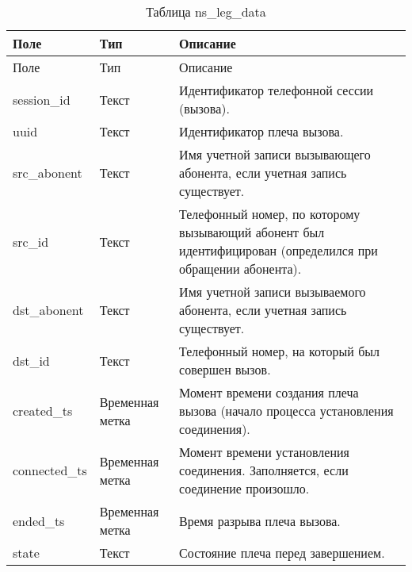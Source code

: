 \begin{small}
    \begin{longtable}{|p{}|p{}|p{}|}
        \caption{Таблица ns\_leg\_data}
        \label{tab:db:ns-leg-data}
        \\ \hline
        Поле & Тип & Описание \\
        \hline \endfirsthead
        \hline
        Поле & Тип & Описание \\
        \hline
        \endhead
        \hline \endlastfoot
        session\_id &
        Текст &
                Идентификатор телефонной сессии (вызова). \\
 \hline
        uuid &
        Текст &
                Идентификатор плеча вызова. \\
 \hline
        src\_abonent &
        Текст &
                Имя учетной записи вызывающего абонента, если учетная запись существует. \\
 \hline
        src\_id &
        Текст &
                Телефонный номер, по которому вызывающий абонент был идентифицирован (определился при обращении абонента). \\
 \hline
        dst\_abonent &
        Текст &
                Имя учетной записи вызываемого абонента, если учетная запись существует. \\
 \hline
        dst\_id &
        Текст &
                Телефонный номер, на который был совершен вызов. \\
 \hline
        created\_ts &
        Временная метка &
                Момент времени создания плеча вызова (начало процесса установления соединения). \\
 \hline
        connected\_ts &
        Временная метка &
                Момент времени установления соединения.
        Заполняется, если соединение произошло.\\
 \hline
        ended\_ts &
        Временная метка &
                Время разрыва плеча вызова. \\
 \hline
        state &
        Текст &
                Состояние плеча перед завершением. \\
    \end{longtable}
\end{small}

